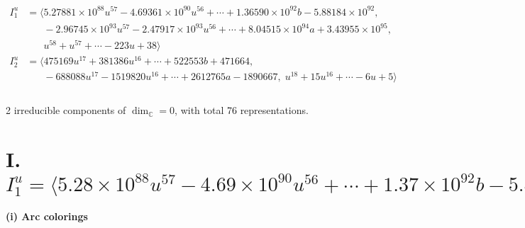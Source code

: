 \documentclass[1p]{elsarticle_modified}
\theoremstyle{definition}
\begin{document}
\begin{align*}
I^u_{1}&=\langle 
5.27881\times10^{88} u^{57}-4.69361\times10^{90} u^{56}+\cdots+1.36590\times10^{92} b-5.88184\times10^{92},\\
\phantom{I^u_{1}}&\phantom{= \langle  }-2.96745\times10^{93} u^{57}-2.47917\times10^{93} u^{56}+\cdots+8.04515\times10^{94} a+3.43955\times10^{95},\\
\phantom{I^u_{1}}&\phantom{= \langle  }u^{58}+u^{57}+\cdots-223 u+38\rangle \\
I^u_{2}&=\langle 
475169 u^{17}+381386 u^{16}+\cdots+522553 b+471664,\\
\phantom{I^u_{2}}&\phantom{= \langle  }-688088 u^{17}-1519820 u^{16}+\cdots+2612765 a-1890667,\;u^{18}+15 u^{16}+\cdots-6 u+5\rangle \\
\\
\end{align*}
\raggedright * 2 irreducible components of $\dim_{\mathbb{C}}=0$, with total 76 representations.\\
\newpage
\renewcommand{\arraystretch}{1}
\centering \section*{I. $I^u_{1}= \langle 5.28\times10^{88} u^{57}-4.69\times10^{90} u^{56}+\cdots+1.37\times10^{92} b-5.88\times10^{92},\;-2.97\times10^{93} u^{57}-2.48\times10^{93} u^{56}+\cdots+8.05\times10^{94} a+3.44\times10^{95},\;u^{58}+u^{57}+\cdots-223 u+38 \rangle$}
\flushleft \textbf{(i) Arc colorings}\\
\end{document}
